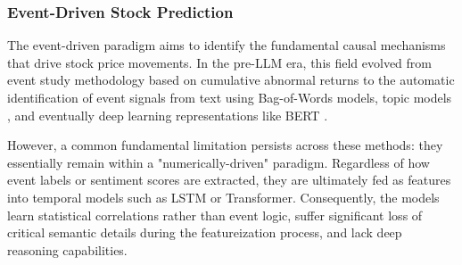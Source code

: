 \documentclass[sigconf, nonacm]{acmart} %
\begin{document}
\subsubsection{Event-Driven Stock Prediction}
The event-driven paradigm aims to identify the fundamental causal mechanisms that drive stock price movements. 
In the pre-LLM era, this field evolved from event study methodology based on cumulative abnormal returns to the automatic identification of event signals from text using Bag-of-Words\cite{zhang2010understanding} models, topic models\cite{blei2009topic} , and eventually deep learning representations like BERT\cite{koroteev2021bert} . 

However, a common fundamental limitation persists across these methods: they essentially remain within a "numerically-driven" paradigm\cite{sundermeyer2012lstm,kalyan2021ammus}. Regardless of how event labels or sentiment scores are extracted, they are ultimately fed as features into temporal models such as LSTM or Transformer. Consequently, the models learn statistical correlations rather than event logic, suffer significant loss of critical semantic details during the featureization process, and lack deep reasoning capabilities.
\end{document}
